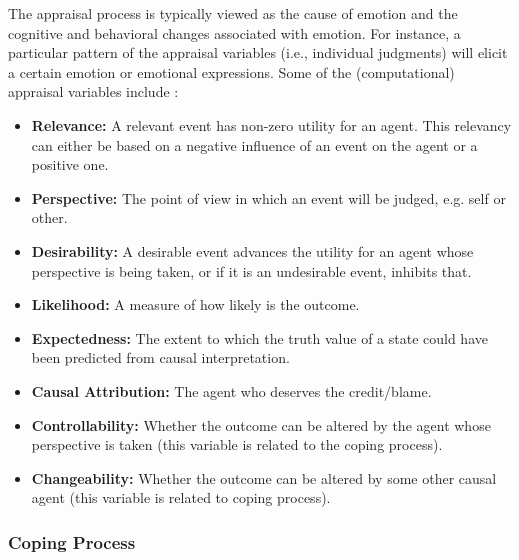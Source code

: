 \documentclass[12pt]{report}
\begin{document}
The appraisal process is typically viewed as the cause of emotion and the
cognitive and behavioral changes associated with emotion. For instance, a
particular pattern of the appraisal variables (i.e., individual judgments) will
elicit a certain emotion or emotional expressions. Some of the (computational)
appraisal variables include \cite{marsella:ema-process-model}:

\begin{itemize}
  \item \textbf{Relevance:} A relevant event has non-zero utility for an agent.
  This relevancy can either be based on a negative influence of an event on the
  agent or a positive one.
  
  \item \textbf{Perspective:} The point of view in which an event will be
  judged, e.g. self or other.
  
  \item \textbf{Desirability:} A desirable event advances the utility for an
  agent whose perspective is being taken, or if it is an undesirable event,
  inhibits that.
  
  \item \textbf{Likelihood:} A measure of how likely is the outcome.
  
  \item \textbf{Expectedness:} The extent to which the truth value of a state
  could have been predicted from causal interpretation.
  
  \item \textbf{Causal Attribution:} The agent who deserves the credit/blame.
  
  \item \textbf{Controllability:} Whether the outcome can be altered by the
  agent whose perspective is taken (this variable is related to the coping
  process).
  
  \item \textbf{Changeability:} Whether the outcome can be altered by some other
  causal agent (this variable is related to coping process).
\end{itemize}

\subsubsection{Coping Process}
\label{sec:coping-process}
\end{document}
